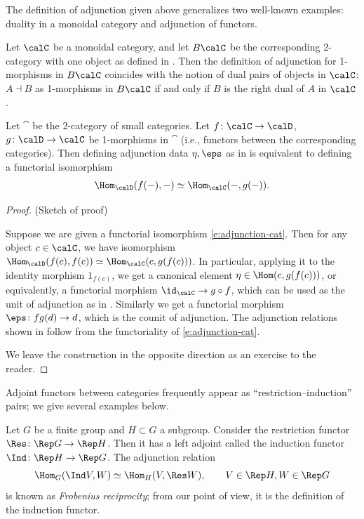 The definition of adjunction given above generalizes two well-known examples:
duality in a monoidal category and adjunction of functors.

\begin{example}\label{x:adjunction-monoidal}
  Let $\calC$ be a monoidal category, and let $B\calC$ be the corresponding
  2-category with one object as defined in . Then the definition of
  adjunction for 1-morphisms in $B\calC$ coincides with the notion of dual pairs
  of objects in $\calC$: $A\dashv B$ as 1-morphisms in $B\calC$ if and only if
  $B$ is the right dual of $A$ in $\calC$.
\end{example}

\begin{theorem}\label{t:adjunction-cat}
  Let $\cat$ be the 2-category of small categories. Let $f\colon \calC\to
  \calD$, $g\colon \calD\to \calC$ be 1-morphisms in $\cat$ \textup{(}i.e., functors
  between the corresponding categories\textup{)}. Then defining adjunction data
  $\eta, \eps$ as in  is equivalent to defining
  a functorial isomorphism
  \begin{equation}\label{e:adjunction-cat}
    \Hom_{\calD}(f(-), -)\simeq \Hom_{\calC}(-, g(-)).
  \end{equation}
\end{theorem}
\begin{proof}
  (Sketch of proof)

  Suppose we are given a functorial isomorphism \eqref{e:adjunction-cat}. Then
  for any object $c\in \calC$, we have isomorphism $\Hom_{\calD}(f(c),
  f(c))\simeq \Hom_{\calC}(c, g(f(c)))$. In particular, applying it to the
  identity morphism $1_{f(c)}$, we get a canonical element $\eta\in \Hom(c,
  g(f(c)))$, or equivalently, a functorial morphism $\id_{\calC}\to g\circ f$,
  which can be used as the unit of adjunction as in .
  Similarly we get a functorial morphism $\eps\colon fg(d)\to d$, which is the
  counit of adjunction. The adjunction relations shown in
   follow from the functoriality of
  \eqref{e:adjunction-cat}.

  We leave the construction in the opposite direction as an exercise to the
  reader.

\end{proof}

Adjoint functors between categories frequently appear as
``restriction--induction'' pairs; we give several examples below.
\begin{example}\label{x:coset-bimodule}
  Let $G$ be a finite group and $H\subset G$ a subgroup. Consider the
  restriction functor $\Res\colon \Rep G\to \Rep H$. Then it has a left adjoint
  called the induction functor $\Ind \colon \Rep H\to \Rep G$. The adjunction
  relation
  $$
  \Hom_G(\Ind V, W)\simeq \Hom_H(V, \Res W), \qquad V\in \Rep H, W\in \Rep G
  $$
  is known as \emph{Frobenius reciprocity};
  from our point of view, it is the
  definition of the induction functor.
 \end{example}

